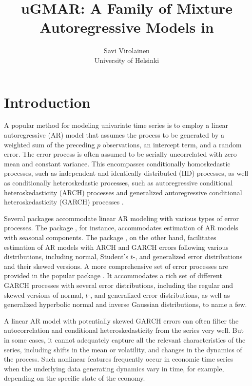 \documentclass[nojss]{jss} %
\author{Savi Virolainen\\ University of Helsinki}
\title{uGMAR: A Family of Mixture Autoregressive Models in \proglang{R}}
\makeatletter
\def\tableofcontents{%
  \section*{\contentsname}%
  \@starttoc{toc}%
}
\makeatother
\begin{document}
\pagebreak
\tableofcontents
\vfill
\pagebreak
{}

\section{Introduction}

A popular method for modeling univariate time series is to employ a linear autoregressive (AR) model that assumes the process to be generated by a weighted sum of the preceding $p$ observations, an intercept term, and a random error. The error process is often assumed to be serially uncorrelated with zero mean and constant variance. This encompasses conditionally homoskedastic processes, such as independent and identically distributed (IID) processes, as well as conditionally heteroskedastic processes, such as autoregressive conditional heteroskedasticity (ARCH) processes \citep{Engle:1982} and generalized autoregressive conditional heteroskedasticity (GARCH) processes \citep{Bollerslev:1986}.

Several  packages accommodate linear AR modeling with various types of error processes. The  package  \citep{Hyndman+Athanasopoulos+Bergmeir+Caceres+Chhay+O'Hara-Wild+Petropoulos+Razbash+Wang+Yasmeen:2021}, for instance, accommodates estimation of AR models with seasonal components. The  package  \citep{Wuertz+Chalabi+Boudt+Chausse+Miklovac:2020}, on the other hand, facilitates estimation of AR models with ARCH and GARCH errors following various distributions, including normal, Student's $t$-, and generalized error distributions and their skewed versions. A more comprehensive set of error processes are provided in the popular  package  \citep{Ghalanos:2020}. It accommodates a rich set of different GARCH processes with several error distributions, including the regular and skewed versions of normal, $t$-, and generalized error distributions, as well as generalized hyperbolic normal and inverse Gaussian distributions, to name a few.

A linear AR model with potentially skewed GARCH errors can often filter the autocorrelation and conditional heteroskedasticity from the series very well. But in some cases, it cannot adequately capture all the relevant characteristics of the series, including
shifts in the mean or volatility, and changes in the dynamics of the process. Such nonlinear features frequently occur in economic time series when the underlying data generating dynamics vary in time, for example, depending on the specific state of the economy.
\end{document}

